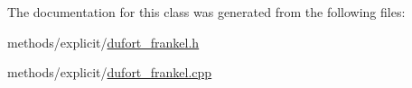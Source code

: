 The documentation for this class was generated from the following files\+:\begin{DoxyCompactItemize}
\item 
methods/explicit/\hyperlink{dufort__frankel_8h}{dufort\+\_\+frankel.\+h}\item 
methods/explicit/\hyperlink{dufort__frankel_8cpp}{dufort\+\_\+frankel.\+cpp}\end{DoxyCompactItemize}
